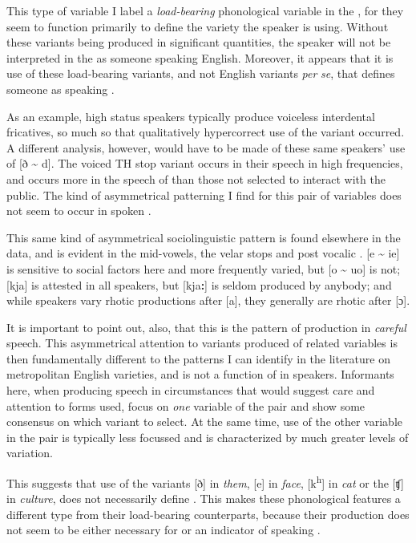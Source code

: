 This type of variable I label a \textit{load-bearing} phonological variable in the , for they seem to function primarily to define the variety the speaker is using.  Without these variants being produced in significant quantities, the speaker will not be interpreted in the  as someone speaking English.  Moreover, it appears that it is use of these load-bearing variants, and not English variants \textit{per} \textit{se}, that defines someone as speaking .  

As an example, high status speakers typically produce voiceless interdental fricatives, so much so that qualitatively hypercorrect use of the variant occurred.  A different analysis, however, would have to be made of these same speakers’ use of [ð {\textasciitilde} d].  The voiced TH stop variant occurs in their speech in high frequencies, and occurs more in the speech of  than those not selected to interact with the public.  The kind of asymmetrical patterning I find for this pair of variables does not seem to occur in spoken .  

This same kind of asymmetrical sociolinguistic pattern is found elsewhere in the data, and is evident in the mid-vowels, the velar stops and post vocalic .  [e {\textasciitilde} ie] is sensitive to social factors here and more frequently varied, but [o {\textasciitilde} uo] is not; [kja] is attested in all speakers, but [kja\textbf{:}] is seldom produced by anybody; and while speakers vary rhotic productions after [a], they generally are rhotic after [ɔ].  

It is important to point out, also, that this is the pattern of production in \textit{careful} speech.  This asymmetrical attention to variants produced of related variables is then fundamentally different to the patterns I can identify in the literature on metropolitan English varieties, and is not a function of  in speakers.   Informants here, when producing speech in circumstances that would suggest care and attention to forms used, focus on \textit{one} variable of the pair and show some consensus on which variant to select.  At the same time, use of the other variable in the pair is typically less focussed and is characterized by much greater levels of variation.  

This suggests that use of the variants [ð] in \textit{them}, [e] in \textit{face}, [k\textsuperscript{h}] in \textit{cat} or the  [ʧ] in \textit{culture}, does not necessarily define .  This makes these phonological features a different type from their load-bearing counterparts, because their production does not seem to be either necessary for or an indicator of speaking .   

